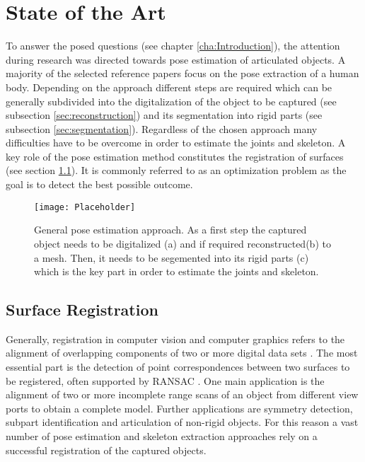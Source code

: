 \chapter{State of the Art}
\label{cha:StateOfTheArt}

To answer the posed questions (see chapter \ref{cha:Introduction}), the attention during research was directed towards pose estimation of articulated objects. A majority of the selected reference papers focus on the pose extraction of a human body. Depending on the approach different steps are required which can be generally subdivided into the digitalization of the object to be captured (see subsection \ref{sec:reconstruction}) and its segmentation into rigid parts (see subsection \ref{sec:segmentation}). Regardless of the chosen approach many difficulties have to be overcome in order to estimate the joints and skeleton. A key role of the pose estimation method constitutes the registration of surfaces (see section \ref{registration}). It is commonly referred to as an optimization problem as the goal is to detect the best possible outcome.
%
\begin{figure}[H]
	\centering
	\texttt{[image: Placeholder]}
	\caption{General pose estimation approach. As a first step the captured object needs to be digitalized (a) and if required reconstructed(b) to a mesh. Then, it needs to be segemented into its rigid parts (c) which is the key part in order to estimate the joints and skeleton.}
	\label{fig:posecapture}
\end{figure}
%
%
\section{Surface Registration}
\label{registration}
Generally, registration in computer vision and computer graphics refers to the alignment of overlapping components of two or more digital data sets \cite{survey}. The most essential part is the detection of point correspondences between two surfaces to be registered, often supported by RANSAC \cite{ransac}. One main application is the alignment of two or more incomplete range scans of an object from different view ports to obtain a complete model. Further applications are symmetry detection, subpart identification and articulation of non-rigid objects. For this reason a vast number of pose estimation and skeleton extraction approaches rely on a successful registration of the captured objects. 

